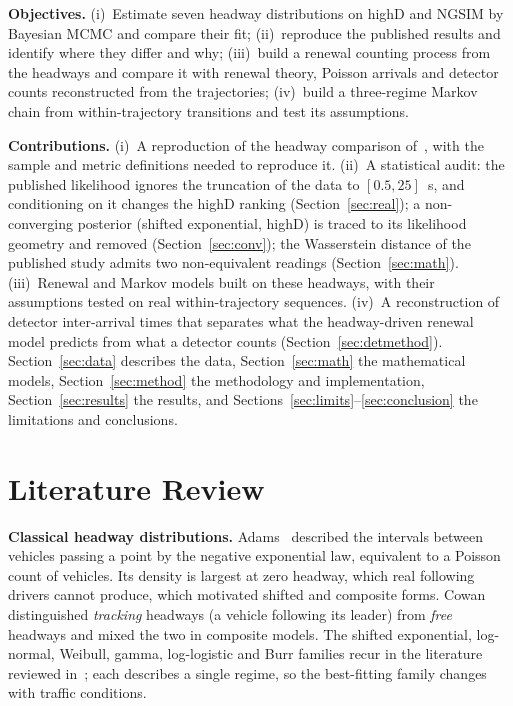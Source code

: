 \documentclass[10pt,a4paper]{article}
\numberwithin{equation}{section}
\begin{document}
\noindent\textbf{Objectives.} (i)~Estimate seven headway distributions on highD and NGSIM by Bayesian MCMC and compare their fit; (ii)~reproduce the published results and identify where they differ and why;
(iii)~build a renewal counting process from the headways and compare it with renewal theory, Poisson arrivals and detector counts reconstructed from the trajectories;
(iv)~build a three-regime Markov chain from within-trajectory transitions and test its assumptions.

\noindent\textbf{Contributions.} (i)~A reproduction of the headway comparison of~\cite{leungbootnak}, with the sample and metric definitions needed to reproduce it.
(ii)~A statistical audit: the published likelihood ignores the truncation of the data to $[0.5,25]$~s, and conditioning on it changes the highD ranking (Section~\ref{sec:real});
a non-converging posterior (shifted exponential, highD) is traced to its likelihood geometry and removed (Section~\ref{sec:conv}); the Wasserstein distance of the published study admits two non-equivalent readings (Section~\ref{sec:math}).
(iii)~Renewal and Markov models built on these headways, with their assumptions tested on real within-trajectory sequences.
(iv)~A reconstruction of detector inter-arrival times that separates what the headway-driven renewal model predicts from what a detector counts (Section~\ref{sec:detmethod}).
Section~\ref{sec:data} describes the data, Section~\ref{sec:math} the mathematical models, Section~\ref{sec:method} the methodology and implementation, Section~\ref{sec:results} the results, and Sections~\ref{sec:limits}--\ref{sec:conclusion} the limitations and conclusions.

\section{Literature Review}\label{sec:lit}
\textbf{Classical headway distributions.} Adams~\cite{adams1936} described the intervals between vehicles passing a point by the negative exponential law, equivalent to a Poisson count of vehicles.
Its density is largest at zero headway, which real following drivers cannot produce, which motivated shifted and composite forms. Cowan~\cite{cowan1975} distinguished \emph{tracking} headways (a vehicle following its leader) from \emph{free} headways and mixed the two in
composite models. The shifted exponential, log-normal, Weibull, gamma, log-logistic and Burr families recur in the literature reviewed in~\cite{leungbootnak}; each describes a single regime, so the best-fitting family changes with traffic conditions.
\end{document}
